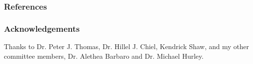 \documentclass{beamer}
\begin{document}
% 
%   
% 
% 
% 
% 
% 

\begin{frame}
        \frametitle{References}
        
        
\end{frame}



\begin{frame}
\frametitle{Acknowledgements}
Thanks to Dr. Peter J. Thomas, Dr. Hillel J. Chiel, Kendrick Shaw, and my other committee members, Dr. Alethea Barbaro and Dr. Michael Hurley.
\end{frame}
\end{document}
